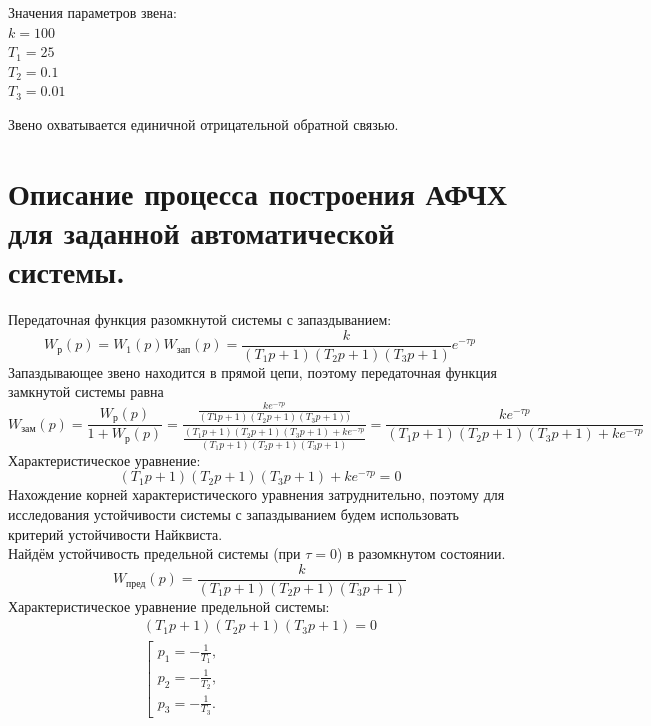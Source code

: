 \documentclass[12pt]{article}
\begin{document}
Значения параметров звена: \\
$k = 100$\\
$T_1 =25$\\
$T_2 = 0.1$ \\
$T_3 = 0.01$

Звено охватывается единичной отрицательной обратной связью. \\ 

\section{Описание процесса построения АФЧХ для заданной автоматической
системы.}
Передаточная функция разомкнутой системы с запаздыванием:
\begin{equation}
    W_{р}(p) = W_1(p)W_{зап}(p) = \frac{k}{(T_1p + 1)(T_2p + 1)(T_3p + 1)}e^{-\tau p} 
\end{equation}
Запаздывающее звено находится в прямой цепи, поэтому передаточная функция замкнутой системы равна 
\begin{equation}
    W_{зам}(p) = \frac{W_{р}(p)}{1 + W_{р}(p)} = \frac{\frac{ke^{-\tau p}}{(T1p + 1)(T_2p + 1)(T_3p + 1))}}{\frac{(T_1p + 1)(T_2p + 1)(T_3p + 1) + ke^{-\tau p}}{(T_1p + 1)(T_2p + 1)(T_3p + 1)}} = \frac{ke^{-\tau p}}{(T_1p + 1)(T_2p + 1)(T_3p + 1) + ke^{-\tau p}}
\end{equation}
Характеристическое уравнение:
\begin{equation}
    (T_1p + 1)(T_2p + 1)(T_3p + 1) + ke^{-\tau p} = 0
\end{equation}
Нахождение корней характеристического уравнения затруднительно, поэтому для исследования устойчивости системы с запаздыванием будем использовать критерий устойчивости Найквиста. \\
Найдём устойчивость предельной системы (при $\tau = 0$) в разомкнутом состоянии.
\begin{equation}
    W_{пред}(p) = \frac{k}{(T_1p + 1)(T_2p + 1)(T_3p + 1)}
\end{equation}
Характеристическое уравнение предельной системы:
\begin{equation}
\begin{gathered}
    (T_1p + 1)(T_2p + 1)(T_3p + 1) = 0 \\
    \left[
       \begin{gathered}
        p_1 = -\frac{1}{T_1}, \\
        p_2 = -\frac{1}{T_2}, \\
        p_3 = -\frac{1}{T_3}.
     \end{gathered}
     \right.
\end{gathered}
\end{equation}
\end{document}
